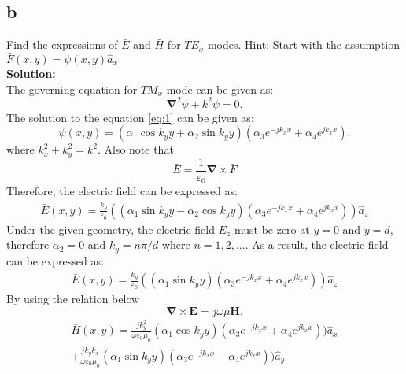 \documentclass[11pt]{amsart}
\begin{document}
\subsection*{b}
Find the expressions of $\bar{E}$ and $\bar{H}$ for $TE_x$ modes. Hint: Start with the assumption $\bar{F}(x,y)=\psi(x,y)\hat{a}_x$ 
\\
\textbf{Solution:}\\
The governing equation for $TM_x$ mode can be given as:
\begin{equation}
\label{eq:10}
 \mathbf{\nabla}^2 \psi +k^2 \psi=0.
\end{equation}
The solution to the equation \ref{eq:1} can be given as:
\begin{equation}
\label{eq:11}
\psi(x,y)= (\alpha_1 \cos k_y y +\alpha_2 \sin k_y y)(\alpha_3 e^{-j k_x x}+\alpha_4 e^{j k_x x}).
\end{equation}
where $k_{x}^2+k_{y}^2=k^2$. Also note that
\begin{equation}
\label{eq:12}
\bar{E}=\frac{1}{\varepsilon_0}\mathbf{\nabla}\times \bar{F}
\end{equation}
Therefore, the electric field can be expressed as:
\begin{equation}
\label{eq:13}
\begin{split}
\bar{E}(x,y)= \frac{k_y}{\varepsilon_0}((\alpha_1 \sin k_y y -\alpha_2 \cos k_y y)(\alpha_3 e^{-j k_x x}+\alpha_4 e^{j k_x x}))\hat{a}_z
\end{split}
\end{equation}
Under the given geometry, the electric field $E_z$ must be zero at $y=0$ and $y=d$, therefore $\alpha_2=0$ and $k_y=n \pi/d$ where $n=1,2,...$. As a result, the electric field can be expressed as:
\begin{equation}
\label{eq:14}
\begin{split}
\bar{E}(x,y)= \frac{k_y}{\varepsilon_0}((\alpha_1 \sin k_y y)(\alpha_3 e^{-j k_x x}+\alpha_4 e^{j k_x x}))\hat{a}_z
\end{split}
\end{equation}
By using the relation below
\begin{equation}
\label{eq:15}
\mathbf{\nabla}\times \mathbf{E}=j \omega \mu \mathbf{H}.
\end{equation}
\begin{equation}
\label{eq:16}
\begin{split}
\bar{H}(x,y)= \frac{j k_{y}^2}{\omega \varepsilon_0 \mu_0 }(\alpha_1 \cos k_y y)(\alpha_3 e^{-j k_x x}+\alpha_4 e^{j k_x x}))\hat{a}_x
\\
+\frac{j k_{y}k_{x}}{\omega \varepsilon_0 \mu_0 }( \alpha_1 \sin k_y y)(\alpha_3 e^{-j k_x x}-\alpha_4 e^{j k_x x}))\hat{a}_y
\end{split}
\end{equation}
\end{document}
